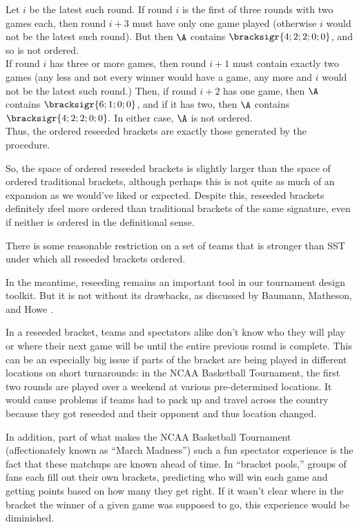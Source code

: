 {{    Let $i$ be the latest such round. If round $i$ is the first of three rounds with two games each, then round $i+3$ must have only one game played (otherwise $i$ would not be the latest such round). But then $\A$ contains $\bracksigr{4;2;2;0;0}$, and so is not ordered.\\
    
    If round $i$ has three or more games, then round $i+1$ must contain exactly two games (any less and not every winner would have a game, any more and $i$ would not be the latest such round.) Then, if round $i+2$ has one game, then $\A$ contains $\bracksigr{6;1;0;0}$, and if it has two, then $\A$ contains $\bracksigr{4;2;2;0;0}.$ In either case, $\A$ is not ordered.\\

    Thus, the ordered reseeded brackets are exactly those generated by the procedure.
}{}

So, the space of ordered reseeded brackets is slightly larger than the space of ordered traditional brackets, although perhaps this is not quite as much of an expansion as we would've liked or expected. Despite this, reseeded brackets definitely \i{feel} more ordered than traditional brackets of the same signature, even if neither is ordered in the definitional sense.

\begin{conj}{}{}
    There is some reasonable restriction on a set of teams that is stronger than SST under which all reseeded brackets ordered.
\end{conj}

In the meantime, reseeding remains an important tool in our tournament design toolkit. But it is not without its drawbacks, as discussed by Baumann, Matheson, and Howe \cite{reseeding_issues}. 

In a reseeded bracket, teams and spectators alike don't know who they will play or where their next game will be until the entire previous round is complete. This can be an especially big issue if parts of the bracket are being played in different locations on short turnarounds: in the NCAA Basketball Tournament, the first two rounds are played over a weekend at various pre-determined locations. It would cause problems if teams had to pack up and travel across the country because they got reseeded and their opponent and thus location changed.

In addition, part of what makes the NCAA Basketball Tournament (affectionately known as ``March Madness'') such a fun spectator experience is the fact that these matchups are known ahead of time. In ``bracket pools,'' groups of fans each fill out their own brackets, predicting who will win each game and getting points based on how many they get right. If it wasn't clear where in the bracket the winner of a given game was supposed to go, this experience would be diminished.

}
